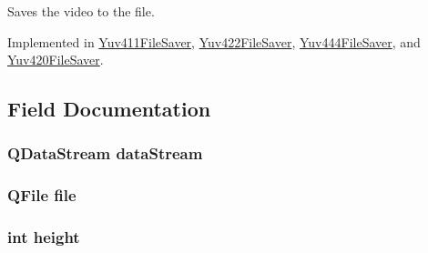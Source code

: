 Saves the video to the file. 



Implemented in \hyperlink{classUtility_1_1Yuv411FileSaver_aae2c382151ef7c9aa913361172b30db6}{Yuv411\+File\+Saver}, \hyperlink{classUtility_1_1Yuv422FileSaver_aae2c382151ef7c9aa913361172b30db6}{Yuv422\+File\+Saver}, \hyperlink{classUtility_1_1Yuv444FileSaver_aae2c382151ef7c9aa913361172b30db6}{Yuv444\+File\+Saver}, and \hyperlink{classUtility_1_1Yuv420FileSaver_aae2c382151ef7c9aa913361172b30db6}{Yuv420\+File\+Saver}.



\subsection{Field Documentation}
\hypertarget{classUtility_1_1YuvFileSaver_a76868f3c583ad31447f724a6dcce0a8a}{}
\subsubsection[{data\+Stream}]{\setlength{\rightskip}{0pt plus 5cm}Q\+Data\+Stream data\+Stream\hspace{0.3cm}{\ttfamily [protected]}}\label{classUtility_1_1YuvFileSaver_a76868f3c583ad31447f724a6dcce0a8a}
\hypertarget{classUtility_1_1YuvFileSaver_a74a949f8555712ca2e528cf69d0d7f68}{}
\subsubsection[{file}]{\setlength{\rightskip}{0pt plus 5cm}Q\+File file\hspace{0.3cm}{\ttfamily [protected]}}\label{classUtility_1_1YuvFileSaver_a74a949f8555712ca2e528cf69d0d7f68}
\hypertarget{classUtility_1_1YuvFileSaver_ad12fc34ce789bce6c8a05d8a17138534}{}
\subsubsection[{height}]{\setlength{\rightskip}{0pt plus 5cm}int height\hspace{0.3cm}{\ttfamily [protected]}}\label{classUtility_1_1YuvFileSaver_ad12fc34ce789bce6c8a05d8a17138534}
\hypertarget{classUtility_1_1YuvFileSaver_a1c4d4daa00ecea5e8390244e057da0df}{}

